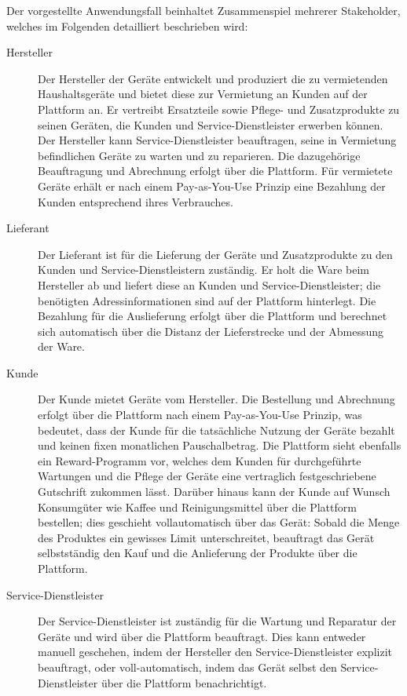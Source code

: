 Der vorgestellte Anwendungsfall beinhaltet Zusammenspiel mehrerer Stakeholder, welches im Folgenden detailliert beschrieben wird:
\begin{description}
  \item[Hersteller] Der Hersteller der Geräte entwickelt und produziert die zu vermietenden Haushaltsgeräte und bietet diese zur Vermietung an Kunden auf der Plattform an. Er vertreibt Ersatzteile sowie Pflege- und Zusatzprodukte zu seinen Geräten, die Kunden und Service-Dienstleister erwerben können. Der Hersteller kann Service-Dienstleister beauftragen, seine in Vermietung befindlichen Geräte zu warten und zu reparieren. Die dazugehörige Beauftragung und Abrechnung erfolgt über die Plattform. Für vermietete Geräte erhält er nach einem Pay-as-You-Use Prinzip eine Bezahlung der Kunden entsprechend ihres Verbrauches.
  \item[Lieferant] Der Lieferant ist für die Lieferung der Geräte und Zusatzprodukte zu den Kunden und Service-Dienstleistern zuständig. Er holt die Ware beim Hersteller ab und liefert diese an Kunden und Service-Dienstleister; die benötigten Adressinformationen sind auf der Plattform hinterlegt. Die Bezahlung für die Auslieferung erfolgt über die Plattform und berechnet sich automatisch über die Distanz der Lieferstrecke und der Abmessung der Ware.
  \item[Kunde] Der Kunde mietet Geräte vom Hersteller. Die Bestellung und Abrechnung erfolgt über die Plattform nach einem Pay-as-You-Use Prinzip, was bedeutet, dass der Kunde für die tatsächliche Nutzung der Geräte bezahlt und keinen fixen monatlichen Pauschalbetrag. Die Plattform sieht ebenfalls ein Reward-Programm vor, welches dem Kunden für durchgeführte Wartungen und die Pflege der Geräte eine vertraglich festgeschriebene Gutschrift zukommen lässt. Darüber hinaus kann der Kunde auf Wunsch Konsumgüter wie Kaffee und Reinigungsmittel über die Plattform bestellen; dies geschieht vollautomatisch über das Gerät: Sobald die Menge des Produktes ein gewisses Limit unterschreitet, beauftragt das Gerät selbstständig den Kauf und die Anlieferung der Produkte über die Plattform.
  \item[Service-Dienstleister] Der Service-Dienstleister ist zuständig für die Wartung und Reparatur der Geräte und wird über die Plattform beauftragt. Dies kann entweder manuell geschehen, indem der Hersteller den Service-Dienstleister explizit beauftragt, oder voll-automatisch, indem das Gerät selbst den Service-Dienstleister über die Plattform benachrichtigt.
\end{description}

